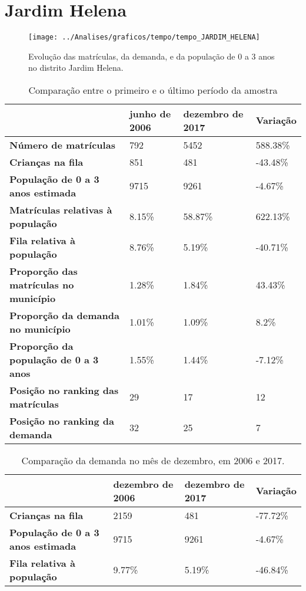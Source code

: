 \section{Jardim Helena}
\begin{figure}[H]
\centering
\texttt{[image: ../Analises/graficos/tempo/tempo\_JARDIM\_HELENA]}
\caption{Evolução das matrículas, da demanda, e da população de 0 a 3 anos no distrito Jardim Helena.}
\end{figure}
\begin{table}[H]
\begin{tabular}{|l|l|l|l|}
\hline
\textbf{}                                      & \textbf{junho de 2006}       & \textbf{dezembro de 2017}    & \textbf{Variação} \\ \hline
\textbf{Número de matrículas}                  & 792 & 5452 & 588.38\% \\ \hline
\textbf{Crianças na fila}                      & 851 & 481 & -43.48\% \\ \hline
\textbf{População de 0 a 3 anos estimada}      & 9715 & 9261 & -4.67\% \\ \hline
\textbf{Matrículas relativas à população}      & 8.15\% & 58.87\% & 622.13\% \\ \hline
\textbf{Fila relativa à população}             & 8.76\% & 5.19\% & -40.71\% \\ \hline
\textbf{Proporção das matrículas no município} & 1.28\% & 1.84\% & 43.43\% \\ \hline
\textbf{Proporção da demanda no município}     & 1.01\% & 1.09\% & 8.2\% \\ \hline
\textbf{Proporção da população de 0 a 3 anos}  & 1.55\% & 1.44\% & -7.12\% \\ \hline
\textbf{Posição no ranking das matrículas}     & 29 & 17 & 12 \\ \hline
\textbf{Posição no ranking da demanda}         & 32 & 25 & 7 \\ \hline
\end{tabular}
\caption{Comparação entre o primeiro e o último período da amostra}
\end{table}
\begin{table}[H]
\begin{tabular}{|l|l|l|l|}
\hline
\textbf{}                                 & \textbf{dezembro de 2006} & \textbf{dezembro de 2017} & \textbf{Variação} \\ \hline
\textbf{Crianças na fila}                      & 2159 & 481 & -77.72\% \\ \hline
\textbf{População de 0 a 3 anos estimada}      & 9715 & 9261 & -4.67\% \\ \hline
\textbf{Fila relativa à população}             & 9.77\% & 5.19\% & -46.84\% \\ \hline
\end{tabular}
\caption{Comparação da demanda no mês de dezembro, em 2006 e 2017.}
\end{table}
